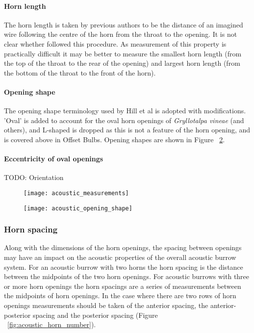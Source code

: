 \documentclass{article}
\begin{document}
   \paragraph{Horn length}
   The horn length is taken  by previous authors to be the distance of an imagined wire following the centre of the horn from the throat to the opening. It is not clear whether \cite{jafari2015} followed this procedure. As measurement of this property is practically difficult it may be better to measure the smallest horn length (from the top of the throat to the rear of the opening) and largest horn length (from the bottom of the throat to the front of the horn).
   \paragraph{Opening shape}
   The opening shape terminology used by Hill et al \cite{hill2006} is adopted with modifications. 'Oval' is added to account for the oval horn openings of \textit{Gryllotalpa vineae} (and others), and L-shaped is dropped as this is not a feature of the horn opening, and is covered above in Offset Bulbs. Opening shapes are shown in Figure ~\ref{fig:acoustic_opening_shape}.
   \paragraph{Eccentricity of oval openings}
   TODO: Orientation
   \begin{figure}[h]
   	\texttt{[image: acoustic\_measurements]}
   	\caption{}
   	\label{fig:acoustic_measurements}
   \end{figure}
   
   \begin{figure}[h]
   	\texttt{[image: acoustic\_opening\_shape]}
   	\caption{}
   	\label{fig:acoustic_opening_shape}
   \end{figure}
   
   \subsubsection{Horn spacing}
   Along with the dimensions of the horn openings, the spacing between openings may have an impact on the acoustic properties of the overall acoustic burrow system. For an acoustic burrow with two horns the horn spacing is the distance between the midpoints of the two horn openings. For acoustic burrows with three or more horn openings the horn spacings are a series of measurements between the midpoints of horn openings. In the case where there are two rows of horn openings measurements should be taken of the anterior spacing, the anterior-posterior spacing and the posterior spacing (Figure ~\ref{fig:acoustic_horn_number}).
   
\end{document}
